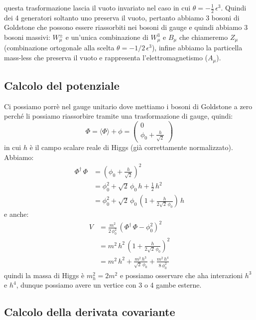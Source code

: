 questa trasformazione lascia il vuoto invariato nel caso in cui $\theta = -\frac{1}{2}\, \epsilon^3$. Quindi dei 4 generatori soltanto uno preserva il vuoto, pertanto abbiamo 3 bosoni di Goldstone che possono essere riassorbiti nei bosoni di gauge e quindi abbiamo 3 bosoni massivi: $W_\mu^\pm$ e un'unica combinazione di $W_\mu^3$ e $B_\mu$ che chiameremo $Z_\mu$ (combinazione ortogonale alla scelta $\theta = -1/2\, \epsilon^3$), infine abbiamo la particella mass-less che preserva il vuoto e rappresenta l'elettromagnetismo ($A_\mu$).


\subsection{Calcolo del potenziale}

Ci possiamo porrè nel gauge unitario dove mettiamo i bosoni di Goldstone a zero perché li possiamo riassorbire tramite una trasformazione di gauge, quindi:
\begin{equation}
    \Phi = \langle\Phi\rangle + \phi = \begin{pmatrix}
        0 \\
        \phi_0 + \frac{h}{\sqrt{2}}
    \end{pmatrix}
\end{equation}
in cui $h$ è il campo scalare reale di Higgs (già correttamente normalizzato). Abbiamo:
\begin{align}
    \Phi^\dagger\, \Phi &= \left(\phi_0 + \frac{h}{\sqrt{2}}\right)^2 \\
    &= \phi_0^2 + \sqrt{2}\, \phi_0\, h + \frac{1}{2}\, h^2 \\
    &= \phi_0^2 + \sqrt{2}\, \phi_0\, \left( 1 + \frac{h}{2\sqrt{2}\, \phi_0} \right)\, h
\end{align}
e anche:
\begin{align}
    V &= \frac{m^2}{2\, \phi_0^2}\, \left( \Phi^\dagger\, \Phi - \phi_0^2\right)^2 \\
    &= m^2\, h^2\, \left( 1 + \frac{h}{2\sqrt{2}\, \phi_0} \right)^2 \\
    &= m^2\, h^2 + \frac{m^2\, h^3}{\sqrt{2}\, \phi_0} + \frac{m^2\, h^4}{8\, \phi_0^2}
\end{align}
quindi la massa di Higgs è $m_h^2 = 2m^2$ e possiamo osservare che aha interazioni $h^3$ e $h^4$, dunque possiamo avere un vertice con 3 o 4 gambe esterne.


\subsection{Calcolo della derivata covariante}

